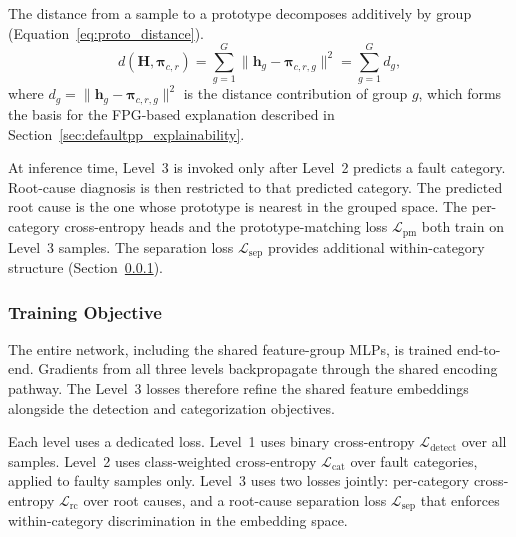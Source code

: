 The distance from a sample to a prototype decomposes additively by group (Equation~\ref{eq:proto_distance}).
\begin{equation}
d(\mathbf{H}, \symbf{\pi}_{c,r}) = \sum_{g=1}^{G} \| \mathbf{h}_g - \symbf{\pi}_{c,r,g} \|^2 = \sum_{g=1}^{G} d_g,
\label{eq:proto_distance}
\end{equation}
where $d_g = \| \mathbf{h}_g - \symbf{\pi}_{c,r,g} \|^2$ is the distance contribution of group $g$, which forms the basis for the FPG-based explanation described in Section~\ref{sec:defaultpp_explainability}.

At inference time, Level~3 is invoked only after Level~2 predicts a fault category. Root-cause diagnosis is then restricted to that predicted category. The predicted root cause is the one whose prototype is nearest in the grouped space. The per-category cross-entropy heads and the prototype-matching loss $\mathcal{L}_{\text{pm}}$ both train on Level~3 samples. The separation loss $\mathcal{L}_{\text{sep}}$ provides additional within-category structure (Section~\ref{sec:defaultpp_training}).

\subsubsection{Training Objective}
\label{sec:defaultpp_training}

The entire network, including the shared feature-group MLPs, is trained end-to-end. Gradients from all three levels backpropagate through the shared encoding pathway. The Level~3 losses therefore refine the shared feature embeddings alongside the detection and categorization objectives.

Each level uses a dedicated loss. Level~1 uses binary cross-entropy $\mathcal{L}_{\text{detect}}$ over all samples. Level~2 uses class-weighted cross-entropy $\mathcal{L}_{\text{cat}}$ over fault categories, applied to faulty samples only. Level~3 uses two losses jointly: per-category cross-entropy $\mathcal{L}_{\text{rc}}$ over root causes, and a root-cause separation loss $\mathcal{L}_{\text{sep}}$ that enforces within-category discrimination in the embedding space.

